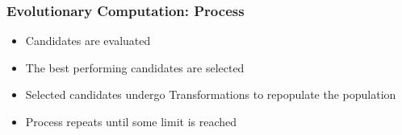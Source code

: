 \documentclass{beamer}
\begin{document}
\begin{frame}
\frametitle{Evolutionary Computation: Process}
 \begin{itemize}
  \item Candidates are evaluated
  \item The best performing candidates are selected
  \item Selected candidates undergo Transformations to repopulate the population
  \item Process repeats until some limit is reached
\end{itemize}
\end{frame}

\end{document}
